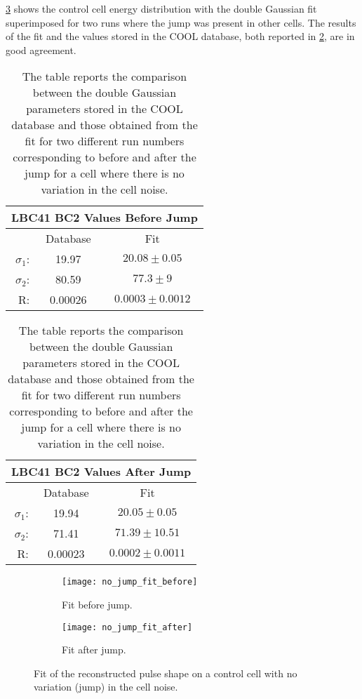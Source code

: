 \cref{fig:no_jump_fit} shows the control cell energy distribution with the
double Gaussian fit superimposed for two runs where the jump was present in
other cells. The results of the fit and the values stored in the COOL database,
both reported in \cref{tab:no_jump_fit}, are in good agreement.
\begin{table}[!h]
  \centering
  \begin{tabular}{r c c}
    \toprule
    \multicolumn{3}{c}{LBC41 BC2 Values Before Jump} \\
    \midrule \midrule
    \quad & Database  & Fit \\
    \midrule
    $\sigma_1$: & 19.97  & $20.08 \pm 0.05$ \\
    $\sigma_2$: & 80.59 & $77.3 \pm 9$ \\
    R\@: & 0.00026  & $0.0003 \pm 0.0012$\\
    \bottomrule
  \end{tabular} \quad
  \begin{tabular}{r c c}
    \toprule
    \multicolumn{3}{c}{LBC41 BC2 Values After Jump} \\
    \midrule \midrule
    \quad & Database & Fit \\
    \midrule
    $\sigma_1$: & 19.94 & $20.05 \pm 0.05$ \\
    $\sigma_2$: & 71.41 & $71.39 \pm 10.51$ \\
    R\@: & 0.00023 & $0.0002 \pm 0.0011$ \\
    \bottomrule
  \end{tabular}
  \caption{The table reports the comparison between the double Gaussian
    parameters stored in the COOL database and those obtained from the
    fit for two different run numbers corresponding to before and after the
    jump for a cell where there is no variation in the cell noise.}
\label{tab:no_jump_fit}
\end{table}

\begin{figure}[!h]
  \centering
  \begin{subfigure}[t]{.8\linewidth}
    \texttt{[image: no\_jump\_fit\_before]}
    \caption{Fit before jump.}
    \label{fig:no_jump_fit_before}
  \end{subfigure}
  \begin{subfigure}[t]{.8\linewidth}
    \texttt{[image: no\_jump\_fit\_after]}
    \caption{Fit after jump.}
    \label{fig:no_jump_fit_after}
  \end{subfigure}
  \caption{Fit of the reconstructed pulse shape on a control cell with no
    variation (jump) in the cell noise.}
  \label{fig:no_jump_fit}
\end{figure}

